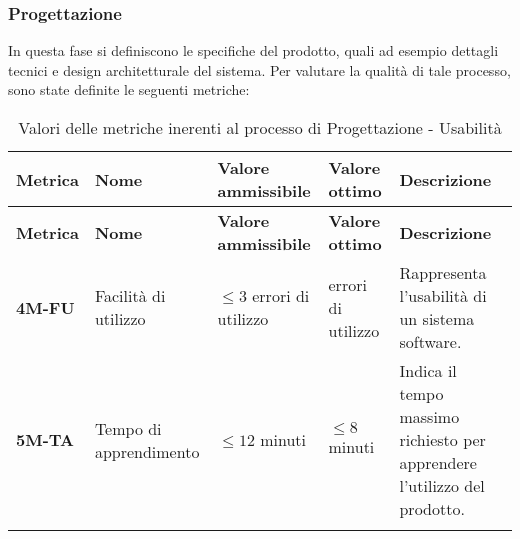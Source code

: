 \subsubsection{Progettazione}
In questa fase si definiscono le specifiche del prodotto, quali ad esempio dettagli tecnici e design architetturale del sistema.
Per valutare la qualità di tale processo, sono state definite le seguenti metriche:
\begin{longtable}{|>{\centering\arraybackslash}p{}|>{\centering\arraybackslash}p{}|>{\centering\arraybackslash}p{}|>{\centering\arraybackslash}p{}|>{\centering\arraybackslash}p{}|}
	\hline
	\textbf{Metrica} & \textbf{Nome}          & \textbf{Valore ammissibile}  & \textbf{Valore ottimo} & \textbf{Descrizione}                                                      \\
	\hline
	\endfirsthead
	\hline
	\textbf{Metrica} & \textbf{Nome}          & \textbf{Valore ammissibile}  & \textbf{Valore ottimo} & \textbf{Descrizione}                                                      \\
	\endhead
	\textbf{4M-FU}   & Facilità di utilizzo   & $\leq 3 $ errori di utilizzo & 0 errori di utilizzo   & Rappresenta l'usabilità di un sistema software.                           \\
	\hline
	\textbf{5M-TA}   & Tempo di apprendimento & $\leq 12 $ minuti            & $\leq 8 $ minuti       & Indica il tempo massimo richiesto per apprendere l'utilizzo del prodotto. \\
	\hline
	\caption{Valori delle metriche inerenti al processo di Progettazione - Usabilità}
	\label{table:2}
\end{longtable}


